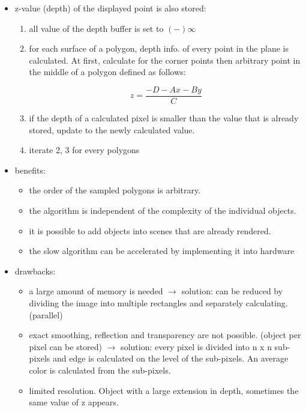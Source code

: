 \documentclass{standalone}
\begin{document}
\begin{itemize}
	\item z-value (depth) of the displayed point is also stored:
		\begin{enumerate}
			\item all value of the depth buffer is set to $(-) \infty$
			\item for each surface of a polygon, depth info. of every point in the plane is calculated. At first, calculate for the corner points then arbitrary point in the middle of a polygon defined as follows:
			
			\begin{equation}
				z = \frac{-D - Ax - By}{C}
			\end{equation}
			
			\item if the depth of a calculated pixel is smaller than the value that is already stored, update to the newly calculated value.
			\item iterate 2, 3 for every polygons
		\end{enumerate}
	\item benefits:
		\begin{itemize}
			\item the order of the sampled polygons is arbitrary.
			\item the algorithm is independent of the complexity of the individual objects. 
			\item it is possible to add objects into scenes that are already rendered.
			\item the slow algorithm can be accelerated by implementing it into hardware
		\end{itemize}
	\item drawbacks:
		\begin{itemize}
			\item a large amount of memory is needed $\rightarrow$ solution: can be reduced by dividing the image into multiple rectangles and separately calculating. (parallel)
			\item exact smoothing, reflection and transparency are not possible. (object per pixel can be stored) $\rightarrow$ solution: every pixel is divided into n x n sub-pixels and edge is calculated on the level of the sub-pixels. An average color is calculated from the sub-pixels. 
			\item limited resolution. Object with a large extension in depth, sometimes the same value of z appears.
		\end{itemize}
\end{itemize}
\end{document}
